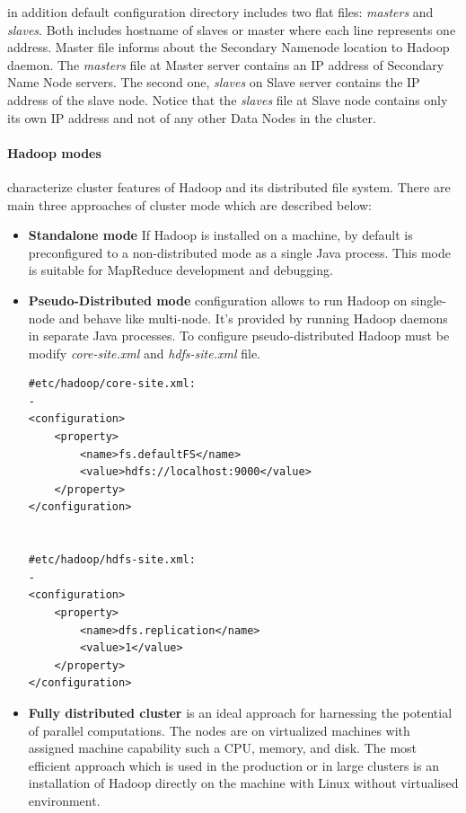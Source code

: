 \documentclass[a4paper,12pt,oneside]{report}
\begin{document}
in addition default configuration directory includes two flat files: \textit{masters} and \textit{slaves}. 
Both includes hostname of slaves or master where each line represents one address. 
Master file informs about the Secondary Namenode location to Hadoop daemon. The \textit{masters} 
file at Master server contains an IP address of Secondary Name Node servers.
The second one, \textit{slaves} on Slave server contains the IP address of the slave node. Notice 
that the \textit{slaves} file at Slave node contains only its own IP address and not of any other Data Nodes in the cluster.


\paragraph{Hadoop modes} characterize cluster features of Hadoop and its distributed file system. 
There are main three approaches of cluster mode which are described below:
\begin{itemize}
\item \textbf{Standalone mode} If Hadoop is installed on a machine, by default is preconfigured to a 
non-distributed mode as a single Java process. This mode  is suitable for MapReduce development and debugging.
\item \textbf{Pseudo-Distributed mode}  configuration allows to run  Hadoop on single-node and behave
 like multi-node. It's provided by running Hadoop daemons in separate Java processes. To configure pseudo-distributed Hadoop must be modify \textit{core-site.xml} and \textit{hdfs-site.xml} file\cite{hadoop_modes}.  


\begin{footnotesize}
\begin{lstlisting}[style=python]
#etc/hadoop/core-site.xml:
-
<configuration>
    <property>
        <name>fs.defaultFS</name>
        <value>hdfs://localhost:9000</value>
    </property>
</configuration>


#etc/hadoop/hdfs-site.xml: 
-
<configuration>
    <property>
        <name>dfs.replication</name>
        <value>1</value>
    </property>
</configuration>
\end{lstlisting}
\end{footnotesize}

\item \textbf{Fully distributed cluster} is an ideal approach for harnessing the potential of
 parallel computations. The nodes are on virtualized machines with assigned machine capability 
 such a CPU, memory, and disk. The most efficient approach which is used in the production or 
 in large clusters is an installation of Hadoop directly on the machine with Linux without virtualised environment.

\end{itemize}
\end{document}
